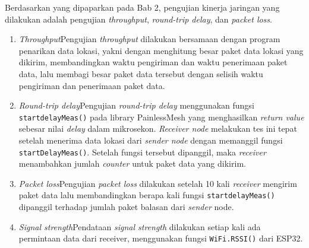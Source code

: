 Berdasarkan yang dipaparkan pada Bab 2, pengujian kinerja jaringan yang dilakukan adalah pengujian \textit{throughput}, \textit{round-trip delay}, dan \textit{packet loss}.
\begin{enumerate}
	\item \textit{Throughput}\newline Pengujian \textit{throughput} dilakukan bersamaan dengan program penarikan data lokasi, yakni dengan menghitung besar paket data lokasi yang dikirim, membandingkan waktu pengiriman dan waktu penerimaan paket data, lalu membagi besar paket data tersebut dengan selisih waktu pengiriman dan penerimaan paket data.
	\item \textit{Round-trip delay}\newline Pengujian \textit{round-trip delay} menggunakan fungsi \verb|startdelayMeas()| pada library PainlessMesh yang menghasilkan \textit{return value} sebesar nilai \textit{delay} dalam mikrosekon. \textit{Receiver node} melakukan tes ini tepat setelah menerima data lokasi dari \textit{sender node} dengan memanggil fungsi \verb|startDelayMeas()|. Setelah fungsi tersebut dipanggil, maka \textit{receiver} menambahkan jumlah \textit{counter} untuk paket data yang dikirim.
	\item \textit{Packet loss}\newline Pengujian \textit{packet loss} dilakukan setelah 10 kali \textit{receiver} mengirim paket data lalu membandingkan berapa kali fungsi \verb|startdelayMeas()| dipanggil terhadap jumlah paket balasan dari \textit{sender} node.
	\item \textit{Signal strength}\newline Pendataan \textit{signal strength} dilakukan setiap kali ada permintaan data dari receiver, menggunakan fungsi \verb|WiFi.RSSI()| dari ESP32.
\end{enumerate}